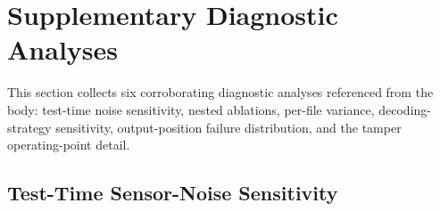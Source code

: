 \documentclass[11pt,a4paper]{article}
\begin{document}


\section{Supplementary Diagnostic Analyses}
\label{supp:app-diagnostics}
This section collects six corroborating diagnostic analyses referenced from the body: test-time noise sensitivity, nested ablations, per-file variance, decoding-strategy sensitivity, output-position failure distribution, and the tamper operating-point detail.

\subsection{Test-Time Sensor-Noise Sensitivity}
\label{app:noise}
\end{document}
